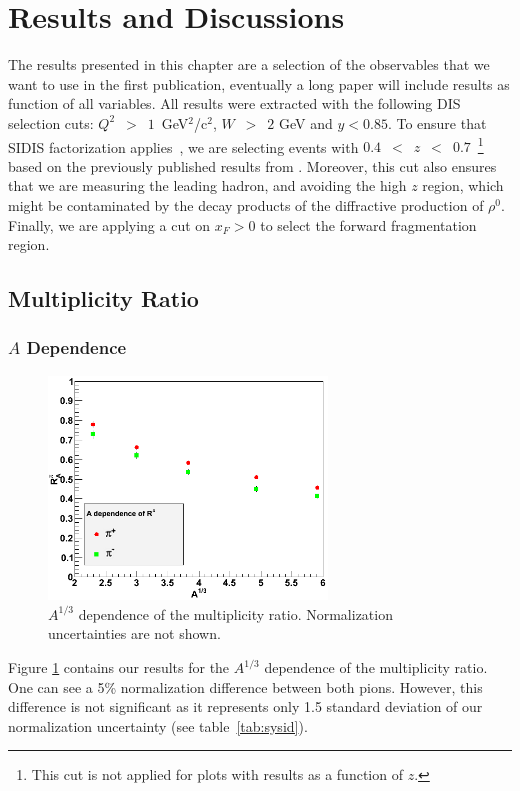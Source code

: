 \section{Results and Discussions}
\label{chap:results}

The results presented in this chapter are a selection of the observables 
that we want to use in the first publication, eventually a long paper will
include results as function of all variables. All results were extracted with the following DIS selection cuts: 
$Q^2$~$>$~$1$~GeV$^2$/c$^2$, $W$~$>$~$2$ GeV and $y<0.85$. To ensure that SIDIS 
factorization applies~\cite{Mulders:2000jt}, we are selecting events with 
$0.4$~$<$~$z$~$<$~$0.7$~\footnote{This cut is not applied for plots with results 
as a function of $z$.} based on the previously published results from 
\cite{Asaturyan:2011mq}. Moreover, this cut also ensures that we are measuring the 
leading hadron, and avoiding the high $z$ region, which might be contaminated by 
the decay products of the diffractive production of $\rho^0$. Finally, we are 
applying a cut on $x_F > 0$ to select the forward fragmentation region.

\subsection{Multiplicity Ratio}

\subsubsection{$A$ Dependence}
\label{sec:resA}

\begin{figure}[p]
\centering
\includegraphics[width=7.4cm] {chap6-fig/F_RvA.png} 
\caption {$A^{1/3}$ dependence of the multiplicity ratio. Normalization 
uncertainties are not shown.}
\label{fig:RA}
\end{figure}

Figure \ref{fig:RA} contains our results for the $A^{1/3}$ dependence of 
the multiplicity ratio. One can see a 5\% normalization difference between both pions. However, this difference is not significant as it represents only 1.5 
standard deviation of our normalization uncertainty (see table~\ref{tab:sysid}).

